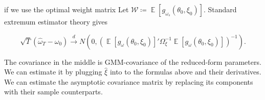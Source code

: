 \documentclass[11pt, letterpaper, twoside, final]{article}
\newcommand*{\dto}{\overset{d}{\longrightarrow}}
\newcommand*{\W}{\mathcal{W}}
\DeclareMathOperator*{\E}{\mathbb{E}}
\begin{document}
\noindent if we use the optimal weight matrix Let $\W \coloneqq \E[g_{\omega_s}(\theta_0, \xi_0)]$.
Standard extremum estimator theory gives

\begin{equation}
    \sqrt{T} \left(\widehat{\omega}_T - \omega_{0}\right)  \dto N\left(0, \left(\E[g_{\omega}(\theta_0, \xi_0)]'
    \Omega_{\xi}^{-1} \E[g_{\omega}(\theta_0, \xi_0)]\right)^{-1}\right).
\end{equation}

\noindent The covariance in the middle is GMM-covariance of the reduced-form parameters.
We can estimate it by plugging $\widehat{\xi}$ into to the formulas above and their derivatives.
We can estimate the asymptotic covariance matrix by replacing its components with their sample counterparts.
\end{document}
